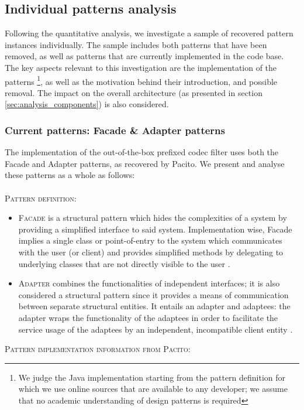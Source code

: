 \subsection{Individual patterns analysis}
Following the quantitative analysis, we investigate a sample of recovered pattern instances individually. The sample includes both patterns that have been removed, as well as patterns that are currently implemented in the code base. The key aspects relevant to this investigation are the implementation of the patterns \footnote{We judge the Java implementation starting from the pattern definition for which we use online sources that are available to any developer; we assume that no academic understanding of design patterns is required}, as well as the motivation behind their introduction, and possible removal. The impact on the overall architecture (as presented in section \ref{sec:analysis_components}) is also considered.

\subsubsection{Current patterns: Facade \& Adapter patterns}
\label{sec:current_facade_adapter}
The implementation of the out-of-the-box prefixed codec filter uses both the Facade and Adapter patterns, as recovered by Pacito. We present and analyse these patterns as a whole as follows:\\\\
\textsc{Pattern definition}: 
\begin{itemize}
    \item \textsc{Facade} is a structural pattern which hides the complexities of a system by providing a simplified interface to said system. Implementation wise, Facade implies a single class or point-of-entry to the system which communicates with the user (or client) and provides simplified methods by delegating to underlying classes that are not directly visible to the user \cite{facade}\cite{facade1}.
    \item \textsc{Adapter} combines the functionalities of independent interfaces; it is also considered a structural pattern since it provides a means of communication between separate structural entities. It entails an adapter and adaptees: the adapter wraps the functionality of the adaptees in order to facilitate the service usage of the adaptees by an independent, incompatible client entity \cite{adapter}\cite{adapter1}.
\end{itemize}
\textsc{Pattern implementation information from Pacito}: 

